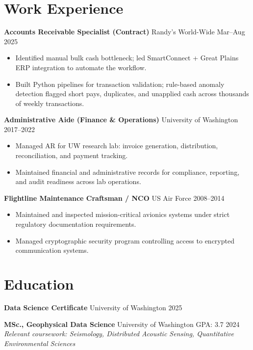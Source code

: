 \documentclass[11pt,a4paper]{article}
\begin{document}
\section*{Work Experience}

\noindent
\textbf{Accounts Receivable Specialist (Contract)} \hfill Randy's World-Wide \hfill Mar--Aug 2025
\begin{itemize}
    \item Identified manual bulk cash bottleneck; led SmartConnect + Great Plains ERP integration to automate the workflow.
    \item Built Python pipelines for transaction validation; rule-based anomaly detection flagged short pays, duplicates, and unapplied cash across thousands of weekly transactions.
\end{itemize}

\vspace{0.2cm}
\noindent
\textbf{Administrative Aide (Finance \& Operations)} \hfill University of Washington \hfill 2017--2022
\begin{itemize}
    \item Managed AR for UW research lab: invoice generation, distribution, reconciliation, and payment tracking.
    \item Maintained financial and administrative records for compliance, reporting, and audit readiness across lab operations.
\end{itemize}

\vspace{0.2cm}
\noindent
\textbf{Flightline Maintenance Craftsman / NCO} \hfill US Air Force \hfill 2008--2014
\begin{itemize}
    \item Maintained and inspected mission-critical avionics systems under strict regulatory documentation requirements.
    \item Managed cryptographic security program controlling access to encrypted communication systems.
\end{itemize}

\section*{Education}

\noindent
\textbf{Data Science Certificate} \hfill University of Washington \hfill 2025

\vspace{0.1cm}
\noindent
\textbf{MSc., Geophysical Data Science} \hfill University of Washington \hfill GPA: 3.7 \hfill 2024 \\
\textit{Relevant coursework: Seismology, Distributed Acoustic Sensing, Quantitative Environmental Sciences}
\end{document}
